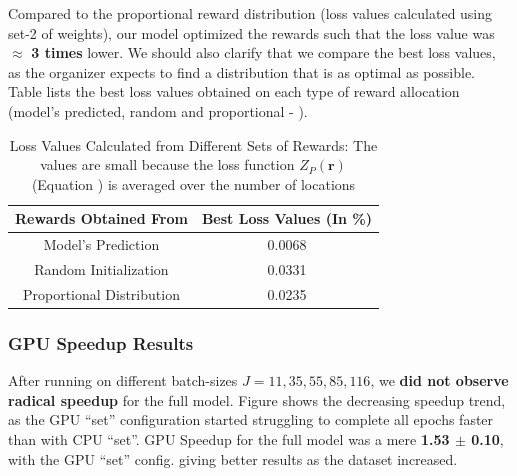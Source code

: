 \documentclass[12pt]{article}
\newcommand{\vect}[1]{\mathbf{#1}}  %
\begin{document}
    Compared to the proportional reward distribution (loss values calculated using set-2 of weights), our model optimized the rewards such that the loss value was $\approx$ \textbf{3 times} lower. We should also clarify that we compare the best loss values, as the organizer expects to find a distribution that is as optimal as possible. Table  lists the best loss values obtained on each type of reward allocation (model's predicted, random and proportional - ).
    \begin{table}[!htbp]
        \centering
        \caption[Loss Values Calculated from Different Sets of Rewards]{Loss Values Calculated from Different Sets of Rewards: The values are small because the loss function $Z_P(\vect{r})$ (Equation ) is averaged over the number of locations}
        \label{tab:Loss Values Calculated from Different Sets of Rewards}
        \begin{tabular}{|c|c|}
            \hline
            \textbf{Rewards Obtained From} & \textbf{Best Loss Values (In \%)}\\
            \hline
            Model's Prediction & 0.0068\\
            Random Initialization & 0.0331\\
            Proportional Distribution & 0.0235\\
            \hline
        \end{tabular}
    \end{table}
    
    \subsubsection{GPU Speedup Results} \label{sec:PriProbRes - GPU}
    After running on different batch-sizes $J = 11, 35, 55, 85, 116$, we \textbf{did not observe radical speedup} for the full model. Figure  shows the decreasing speedup trend, as the GPU ``set'' configuration started struggling to complete all epochs faster than with CPU ``set''. GPU Speedup for the full model was a mere \textbf{1.53 $\pm$ 0.10}, with the GPU ``set'' config. giving better results as the dataset increased. 
    
\end{document}
